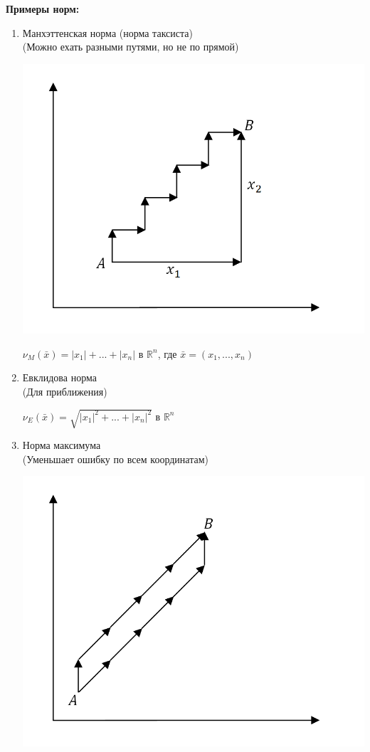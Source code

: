 \documentclass[12pt]{article}
\theoremstyle{definition}
\numberwithin{equation}{section}
\begin{document}
\textbf{Примеры норм:}\begin{enumerate}
\item Манхэттенская норма (норма таксиста)\\
(Можно ехать разными путями, но не по прямой)\begin{center}
\includegraphics[scale=0.4]{l4_7.png}\end{center}
\begin{center}$\nu_M(\bar x) = |x_1|+...+|x_n|$ в $\mathbb{R}^n$, где $\bar x = (x_1,..., x_n)$\end{center}
\item Евклидова норма\\
(Для приближения)
\begin{center}
$\nu_E(\bar x) = \sqrt{|x_1|^2+...+|x_n|^2}$ в $\mathbb{R}^n$\end{center}
\item Норма максимума\\
(Уменьшает ошибку по всем координатам)\begin{center}
\includegraphics[scale=0.4]{l4_8.png}\end{center}

\end{enumerate}
\end{document}
